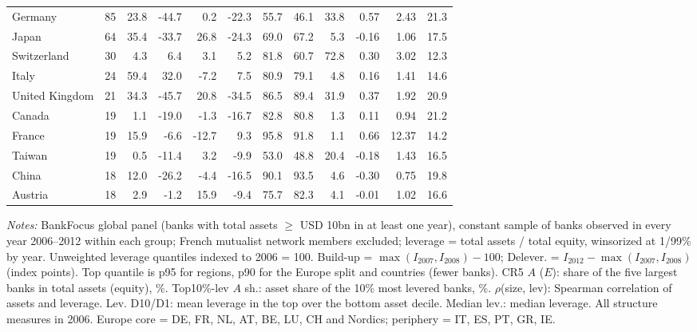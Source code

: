 \documentclass[11pt]{article}
\begin{document}
\begin{table}[htbp]
\begin{threeparttable}
\begin{tabular}{lrrrrrrrrrrr}
Germany & 85 & 23.8 & -44.7 & 0.2 & -22.3 & 55.7 & 46.1 & 33.8 & 0.57 & 2.43 & 21.3 \\
Japan & 64 & 35.4 & -33.7 & 26.8 & -24.3 & 69.0 & 67.2 & 5.3 & -0.16 & 1.06 & 17.5 \\
Switzerland & 30 & 4.3 & 6.4 & 3.1 & 5.2 & 81.8 & 60.7 & 72.8 & 0.30 & 3.02 & 12.3 \\
Italy & 24 & 59.4 & 32.0 & -7.2 & 7.5 & 80.9 & 79.1 & 4.8 & 0.16 & 1.41 & 14.6 \\
United Kingdom & 21 & 34.3 & -45.7 & 20.8 & -34.5 & 86.5 & 89.4 & 31.9 & 0.37 & 1.92 & 20.9 \\
Canada & 19 & 1.1 & -19.0 & -1.3 & -16.7 & 82.8 & 80.8 & 1.3 & 0.11 & 0.94 & 21.2 \\
France & 19 & 15.9 & -6.6 & -12.7 & 9.3 & 95.8 & 91.8 & 1.1 & 0.66 & 12.37 & 14.2 \\
Taiwan & 19 & 0.5 & -11.4 & 3.2 & -9.9 & 53.0 & 48.8 & 20.4 & -0.18 & 1.43 & 16.5 \\
China & 18 & 12.0 & -26.2 & -4.4 & -16.5 & 90.1 & 93.5 & 4.6 & -0.30 & 0.75 & 19.8 \\
Austria & 18 & 2.9 & -1.2 & 15.9 & -9.4 & 75.7 & 82.3 & 4.1 & -0.01 & 1.02 & 16.6 \\
\bottomrule
\end{tabular}
\begin{tablenotes}[flushleft]
\footnotesize
\item \textit{Notes:} BankFocus global panel (banks with total assets $\geq$ USD 10bn in at least one year), constant sample of banks observed in every year 2006--2012 within each group; French mutualist network members excluded; leverage = total assets / total equity, winsorized at 1/99\% by year. Unweighted leverage quantiles indexed to 2006 = 100. Build-up = $\max(I_{2007}, I_{2008}) - 100$; Delever. = $I_{2012} - \max(I_{2007}, I_{2008})$ (index points). Top quantile is p95 for regions, p90 for the Europe split and countries (fewer banks). CR5 $A$ ($E$): share of the five largest banks in total assets (equity), \%. Top10\%-lev $A$ sh.: asset share of the 10\% most levered banks, \%. $\rho$(size, lev): Spearman correlation of assets and leverage. Lev. D10/D1: mean leverage in the top over the bottom asset decile. Median lev.: median leverage. All structure measures in 2006. Europe core = DE, FR, NL, AT, BE, LU, CH and Nordics; periphery = IT, ES, PT, GR, IE.
\end{tablenotes}
\end{threeparttable}
\end{table}
\end{document}
